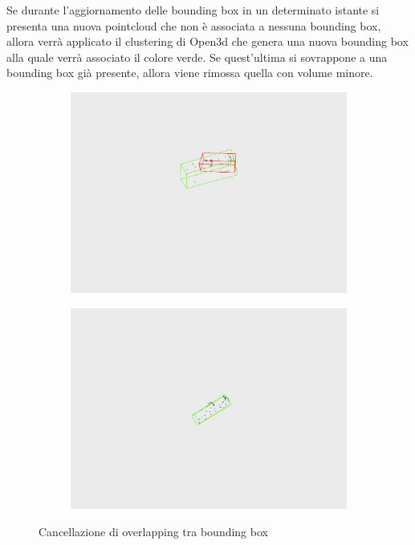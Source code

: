 \documentclass[italian]{report}
\begin{document}
Se durante l'aggiornamento delle bounding box in un determinato istante si presenta una nuova pointcloud che non è associata a nessuna bounding box, allora verrà applicato il clustering di Open3d che genera una nuova bounding box alla quale verrà associato il colore verde. Se quest'ultima si sovrappone a una bounding box già presente, allora viene rimossa quella con volume minore.\\
\begin{figure}[H]
	\centering
	\begin{subfigure}{0.45\textwidth}
		\includegraphics[width=\textwidth]{overlap_remove_1}
	\end{subfigure}
	\begin{subfigure}{0.45\textwidth}
		\includegraphics[width=\textwidth]{overlap_remove_2}
	\end{subfigure}
	\footnotesize
	\caption{Cancellazione di overlapping tra bounding box}
\end{figure}
\end{document}
